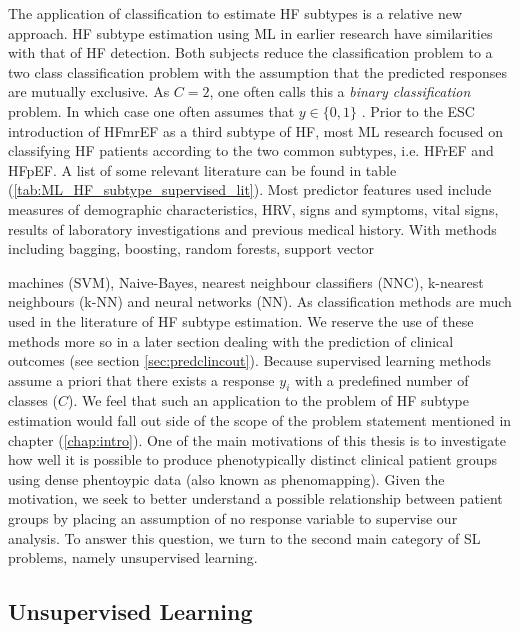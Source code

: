 \documentclass[../thesis.tex]{subfiles}
\begin{document}
\indent The application of classification to estimate HF subtypes is a relative new approach. HF subtype estimation using ML in earlier research have similarities with that of HF detection. Both subjects reduce the classification problem to a two class classification problem with the assumption that the predicted responses are mutually exclusive. As $C = 2$, one often calls this a \textit{binary classification} problem. In which case one often assumes that $y \in \{0,1\}$ \citep{muphy2012machine}. Prior to the ESC introduction of HFmrEF as a third subtype of HF, most ML research focused on classifying HF patients according to the two common subtypes, i.e. HFrEF and HFpEF. A list of some relevant literature can be found in table (\ref{tab:ML_HF_subtype_supervised_lit}). Most predictor features used include measures of demographic characteristics, HRV, signs and symptoms, vital signs, results of laboratory investigations and previous medical history. With methods including bagging, boosting, random forests, support vector



\noindent machines (SVM), Naive-Bayes, nearest neighbour classifiers (NNC), k-nearest neighbours (k-NN) and neural networks (NN). As classification methods are much used in the literature of HF subtype estimation. We reserve the use of these methods more so in a later section dealing with the prediction of clinical outcomes (see section \ref{sec:predclincout}). Because supervised learning methods assume a priori that there exists a response $y_i$ with a predefined number of classes ($C$). We feel that such an application to the problem of HF subtype estimation would fall out side of the scope of the problem statement mentioned in chapter (\ref{chap:intro}). One of the main motivations of this thesis is to investigate how well it is possible to produce phenotypically distinct clinical patient groups using dense phentoypic data (also known as phenomapping). Given the motivation, we seek to better understand a possible relationship between patient groups by placing an assumption of no response variable to supervise our analysis. To answer this question, we turn to the second main category of SL problems, namely unsupervised learning.


\subsection{Unsupervised Learning}
\label{subsec:unsupervisedlearn}
\end{document}
